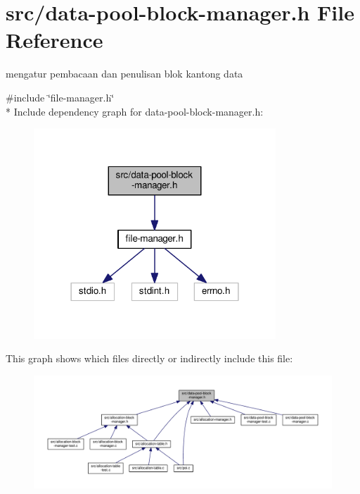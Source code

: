 \hypertarget{data-pool-block-manager_8h}{\section{src/data-\/pool-\/block-\/manager.h File Reference}
\label{data-pool-block-manager_8h}
}


mengatur pembacaan dan penulisan blok kantong data  


{\ttfamily \#include \char`\"{}file-\/manager.\-h\char`\"{}}\\*
Include dependency graph for data-\/pool-\/block-\/manager.h\-:\nopagebreak
\begin{figure}[H]
\begin{center}
\leavevmode
\includegraphics[width=258pt]{data-pool-block-manager_8h__incl}
\end{center}
\end{figure}
This graph shows which files directly or indirectly include this file\-:\nopagebreak
\begin{figure}[H]
\begin{center}
\leavevmode
\includegraphics[width=350pt]{data-pool-block-manager_8h__dep__incl}
\end{center}
\end{figure}
